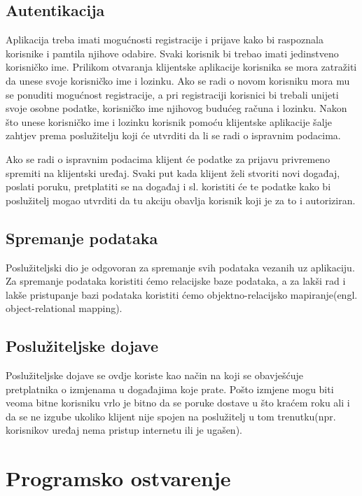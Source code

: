 \documentclass[times, utf8, zavrsni]{fer}
\begin{document}
\section{Autentikacija}

Aplikacija treba imati mogućnosti registracije i prijave kako bi raspoznala korisnike i pamtila njihove odabire. Svaki korisnik bi trebao imati jedinstveno korisničko ime. Prilikom otvaranja klijentske aplikacije korisnika se mora zatražiti da unese svoje korisničko ime i lozinku. Ako se radi o novom korisniku mora mu se ponuditi mogućnost registracije, a pri registraciji korisnici bi trebali unijeti svoje osobne podatke, korisničko ime njihovog budućeg računa i lozinku. Nakon što unese korisničko ime i lozinku korisnik pomoću klijentske aplikacije šalje zahtjev prema poslužitelju koji će utvrditi da li se radi o ispravnim podacima. 

Ako se radi o ispravnim podacima klijent će podatke za prijavu privremeno spremiti na klijentski uređaj. Svaki put kada klijent želi stvoriti novi događaj, poslati poruku, pretplatiti se na događaj i sl. koristiti će te podatke kako bi poslužitelj mogao utvrditi da tu akciju obavlja korisnik koji je za to i autoriziran.

\section{Spremanje podataka}

Poslužiteljski dio je odgovoran za spremanje svih podataka vezanih uz aplikaciju. Za spremanje podataka koristiti ćemo relacijske baze podataka, a za lakši rad i lakše pristupanje bazi podataka koristiti ćemo objektno-relacijsko mapiranje(engl. object-relational mapping).

\section{Poslužiteljske dojave}

Poslužiteljske dojave se ovdje koriste kao način na koji se obavješćuje pretplatnika o izmjenama u događajima koje prate. Pošto izmjene mogu biti veoma bitne korisniku vrlo je bitno da se poruke dostave u što kraćem roku ali i da se ne izgube ukoliko klijent nije spojen na poslužitelj u tom trenutku(npr. korisnikov uređaj nema pristup internetu ili je ugašen).

\chapter{Programsko ostvarenje}
\end{document}
